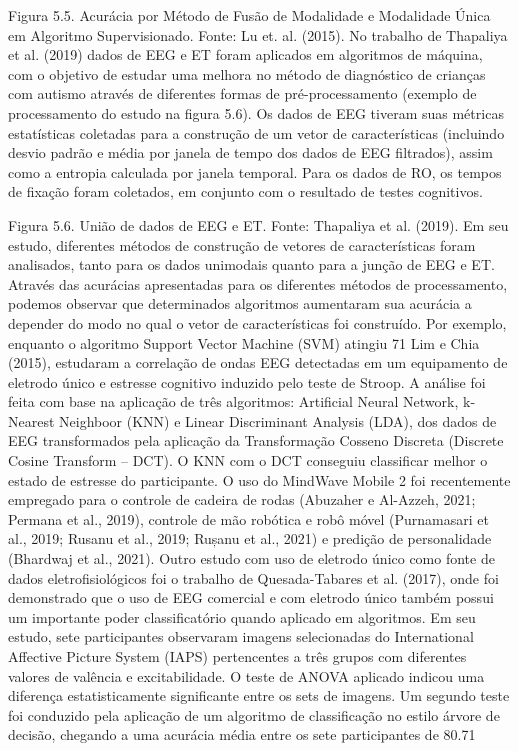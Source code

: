 Figura 5.5. Acurácia por Método de Fusão de Modalidade e Modalidade Única em Algoritmo Supervisionado. Fonte: Lu et. al. (2015).
No trabalho de Thapaliya et al. (2019) dados de EEG e ET foram aplicados em algoritmos de máquina, com o objetivo de estudar uma melhora no método de diagnóstico de crianças com autismo através de diferentes formas de pré-processamento (exemplo de processamento do estudo na figura 5.6). Os dados de EEG tiveram suas métricas estatísticas coletadas para a construção de um vetor de características (incluindo desvio padrão e média por janela de tempo dos dados de EEG filtrados), assim como a entropia calculada por janela temporal. Para os dados de RO, os tempos de fixação foram coletados, em conjunto com o resultado de testes cognitivos. 
 
Figura 5.6. União de dados de EEG e ET. Fonte: Thapaliya et al. (2019).
Em seu estudo, diferentes métodos de construção de vetores de características foram analisados, tanto para os dados unimodais quanto para a junção de EEG e ET. Através das acurácias apresentadas para os diferentes métodos de processamento, podemos observar que determinados algoritmos aumentaram sua acurácia a depender do modo no qual o vetor de características foi construído. Por exemplo, enquanto o algoritmo Support Vector Machine (SVM) atingiu 71%
Lim e Chia (2015), estudaram a correlação de ondas EEG detectadas em um equipamento de eletrodo único e estresse cognitivo induzido pelo teste de Stroop. A análise foi feita com base na aplicação de três algoritmos: Artificial Neural Network, k-Nearest Neighboor (KNN) e Linear Discriminant Analysis (LDA), dos dados de EEG transformados pela aplicação da Transformação Cosseno Discreta (Discrete Cosine Transform – DCT). O KNN com o DCT conseguiu classificar melhor o estado de estresse do participante.
O uso do MindWave Mobile 2 foi recentemente empregado para o controle de cadeira de rodas (Abuzaher e Al-Azzeh, 2021; Permana et al., 2019), controle de mão robótica e robô móvel (Purnamasari et al., 2019; Rusanu et al., 2019; Rușanu et al., 2021) e predição de personalidade (Bhardwaj et al., 2021). Outro estudo com uso de eletrodo único como fonte de dados eletrofisiológicos foi o trabalho de Quesada-Tabares et al. (2017), onde foi demonstrado que o uso de EEG comercial e com eletrodo único também possui um importante poder classificatório quando aplicado em algoritmos. Em seu estudo, sete participantes observaram imagens selecionadas do International Affective Picture System (IAPS) pertencentes a três grupos com diferentes valores de valência e excitabilidade. O teste de ANOVA aplicado indicou uma diferença estatisticamente significante entre os sets de imagens. Um segundo teste foi conduzido pela aplicação de um algoritmo de classificação no estilo árvore de decisão, chegando a uma acurácia média entre os sete participantes de 80.71%
